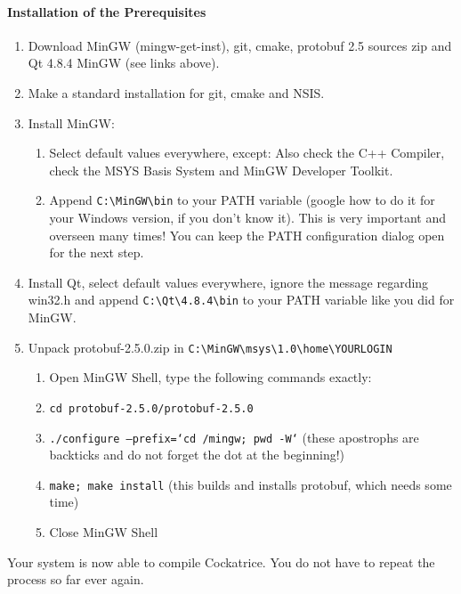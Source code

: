 \documentclass[a4paper]{scrbook}
\newcommand{\shellcmd}[1]{\texttt{\scriptsize #1}}
\begin{document}
\paragraph{Installation of the Prerequisites}
\begin{enumerate}
 \item Download MinGW (mingw-get-inst), git, cmake, protobuf 2.5 sources zip and Qt 4.8.4 MinGW (see links above).
 \item Make a standard installation for git, cmake and NSIS.
 \item Install MinGW:
    \begin{enumerate}
      \item Select default values everywhere, except: Also check the C++ Compiler, check the MSYS Basis System and MinGW Developer Toolkit.
      \item Append \shellcmd{C:\textbackslash MinGW\textbackslash bin} to your PATH variable (google how to do it for your Windows version, if you don't know it).
      This is very important and overseen many times! You can keep the PATH configuration dialog open for the next step.
    \end{enumerate}
 \item Install Qt, select default values everywhere, ignore the message regarding win32.h and append \shellcmd{C:\textbackslash Qt\textbackslash 4.8.4\textbackslash bin} to your PATH variable like you did for MinGW.
 \item Unpack protobuf-2.5.0.zip in \shellcmd{C:\textbackslash MinGW\textbackslash msys\textbackslash 1.0\textbackslash home\textbackslash YOURLOGIN}
    \begin{enumerate}
     \item Open MinGW Shell, type the following commands exactly:
     \item \shellcmd{cd protobuf-2.5.0/protobuf-2.5.0}
     \item \shellcmd{./configure --prefix=`cd /mingw; pwd -W`} (these apostrophs are backticks and do not forget the dot at the beginning!)
     \item \shellcmd{make; make install} (this builds and installs protobuf, which needs some time)
     \item Close MinGW Shell
    \end{enumerate}
\end{enumerate}
Your system is now able to compile Cockatrice. You do not have to repeat the process so far ever again.
\end{document}
